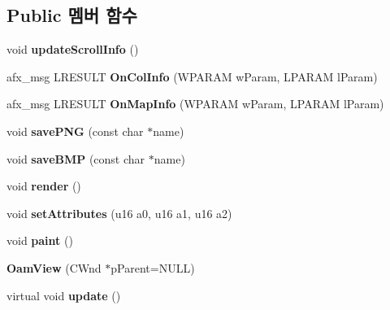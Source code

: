 \subsection*{Public 멤버 함수}
\begin{DoxyCompactItemize}
\item 
\mbox{\label{class_oam_view_ae51c17aebff73f557073546febb45eba}} 
void {\bfseries update\+Scroll\+Info} ()
\item 
\mbox{\label{class_oam_view_a5b910cf923020f054165c52c01d0181f}} 
afx\+\_\+msg L\+R\+E\+S\+U\+LT {\bfseries On\+Col\+Info} (W\+P\+A\+R\+AM w\+Param, L\+P\+A\+R\+AM l\+Param)
\item 
\mbox{\label{class_oam_view_a139d46b95c3f0a9198e7d4fc134f88c2}} 
afx\+\_\+msg L\+R\+E\+S\+U\+LT {\bfseries On\+Map\+Info} (W\+P\+A\+R\+AM w\+Param, L\+P\+A\+R\+AM l\+Param)
\item 
\mbox{\label{class_oam_view_ac5531c409060efd6ef1654ae908db4ef}} 
void {\bfseries save\+P\+NG} (const char $\ast$name)
\item 
\mbox{\label{class_oam_view_aa760ae67c006a164258c21a127e1e847}} 
void {\bfseries save\+B\+MP} (const char $\ast$name)
\item 
\mbox{\label{class_oam_view_a391d8ee2931b2927e936c7100e676451}} 
void {\bfseries render} ()
\item 
\mbox{\label{class_oam_view_aafceb25b05d3ff2eacffa1a53308ee1d}} 
void {\bfseries set\+Attributes} (u16 a0, u16 a1, u16 a2)
\item 
\mbox{\label{class_oam_view_af9092e04b559ef87670e18dd42c45669}} 
void {\bfseries paint} ()
\item 
\mbox{\label{class_oam_view_a58028e15d10221a62f25799321516416}} 
{\bfseries Oam\+View} (C\+Wnd $\ast$p\+Parent=N\+U\+LL)
\item 
\mbox{\label{class_oam_view_a9a54cb2672c3302524a00b744d09b645}} 
virtual void {\bfseries update} ()
\end{DoxyCompactItemize}
